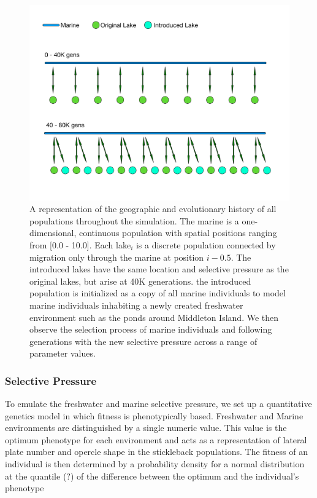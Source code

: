 \documentclass{article}
\begin{document}
\begin{figure}
	\begin{center}
  		\includegraphics[width=0.6\linewidth]{GeographyDiagram}
  		\caption{A representation of the geographic and evolutionary history of all populations throughout the simulation. 
		The marine is a one-dimensional, continuous population with spatial positions ranging from [0.0 - 10.0]. Each 
		lake$_{i}$ is a discrete population connected by migration only through the marine at position $i - 0.5$. The introduced lakes 
		have the same location and selective pressure as the original lakes, but arise at 40K generations.
		the introduced population is initialized as a copy of all marine individuals to model marine 
		individuals inhabiting a newly created freshwater environment such as the ponds around Middleton Island.
		We then observe the selection process of marine individuals and following generations 
		with the new selective pressure across a range of parameter values. 
		}
  		\label{fig:Geo}
	\end{center}
\end{figure}

\subsubsection*{Selective Pressure}

To emulate the freshwater and marine selective pressure, 
we set up a quantitative genetics model in which fitness is phenotypically based. 
Freshwater and Marine environments are distinguished by a single numeric value. 
This value is the optimum phenotype for each environment
and acts as a representation of lateral plate number and opercle shape in the stickleback populations.
The fitness of an individual is then determined by a probability density for a normal distribution 
at the quantile (?) of the difference between the optimum and the individual's phenotype
\end{document}
